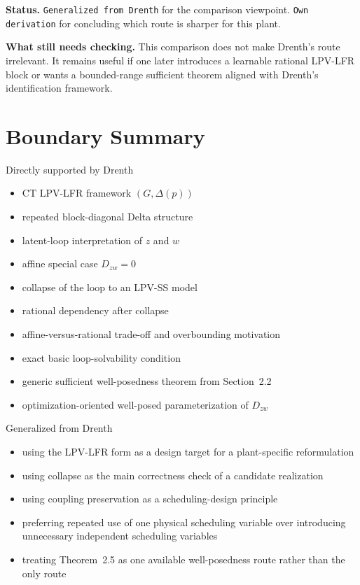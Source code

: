 ﻿\documentclass[11pt]{article}
\newcommand{\audititem}[2]{\par\smallskip\noindent\textbf{#1.} #2\par}
\newcommand{\statusline}[1]{\texttt{#1}}
\begin{document}
\audititem{Status}{\statusline{Generalized from Drenth} for the comparison
viewpoint. \statusline{Own derivation} for concluding which route is sharper for
this plant.}

\audititem{What still needs checking}{This comparison does not make Drenth's
route irrelevant. It remains useful if one later introduces a learnable rational
LPV-LFR block or wants a bounded-range sufficient theorem aligned with Drenth's
identification framework.}

\section{Boundary Summary}

\begin{resultbox}{Directly supported by Drenth}
\begin{itemize}[leftmargin=1.2em]
    \item CT LPV-LFR framework $(G,\Delta(p))$
    \item repeated block-diagonal Delta structure
    \item latent-loop interpretation of $z$ and $w$
    \item affine special case $D_{zw}=0$
    \item collapse of the loop to an LPV-SS model
    \item rational dependency after collapse
    \item affine-versus-rational trade-off and overbounding motivation
    \item exact basic loop-solvability condition
    \item generic sufficient well-posedness theorem from Section~2.2
    \item optimization-oriented well-posed parameterization of $D_{zw}$
\end{itemize}
\end{resultbox}

\begin{resultbox}{Generalized from Drenth}
\begin{itemize}[leftmargin=1.2em]
    \item using the LPV-LFR form as a design target for a plant-specific reformulation
    \item using collapse as the main correctness check of a candidate realization
    \item using coupling preservation as a scheduling-design principle
    \item preferring repeated use of one physical scheduling variable over
    introducing unnecessary independent scheduling variables
    \item treating Theorem~2.5 as one available well-posedness route rather than
    the only route
\end{itemize}
\end{resultbox}
\end{document}

